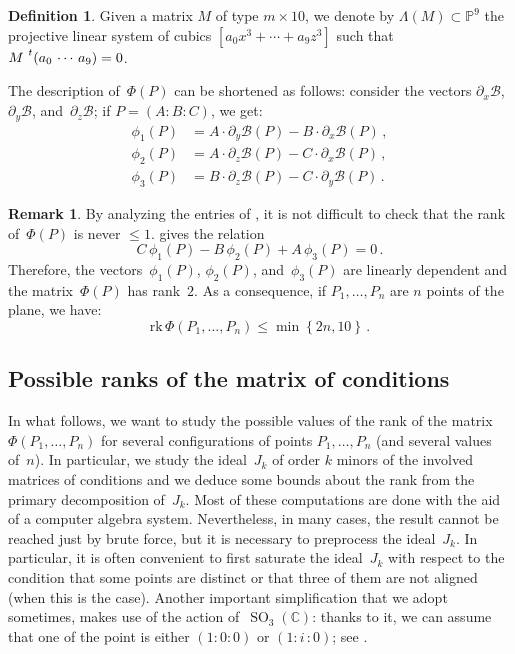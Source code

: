 \documentclass[a4paper, 11pt, reqno]{amsart}
\theoremstyle{plain}
\theoremstyle{definition}
\newtheorem{definition}[lemma]{Definition}
\newtheorem{rmk}[lemma]{Remark}
\newcommand{\C}{\mathbb{C}}
\newcommand{\p}{\mathbb{P}}
\newcommand{\de}{\partial}
\newcommand{\iii}{\textit{i}\,}
\newcommand{\rk}{\ensuremath{\mathrm{rk}}}
\newcommand{\SO}{\operatorname{SO}}
\begin{document}
\begin{definition}
Given a matrix $M$ of type $m \times 10$, we denote by $\Lambda(M) \subset \p^9$ the projective linear system of cubics $[a_0 x^3 + \dotsb + a_9 z^3]$ such that $M \, \prescript{t}{}{\left( a_0 \,  \cdots \,  a_9 \right)} = 0$.
\end{definition}

The description of~$\Phi(P)$ can be shortened as follows: consider the vectors $\de_x \mathcal{B}$,
$\de_y \mathcal{B}$, and~$\de_z \mathcal{B}$;
if $P=(A: B: C)$, we get:
%
\begin{equation}
\label{eq:vector_conditions}
  \begin{aligned}
    \phi_1(P) &= A\cdot \de_y \mathcal{B}(P) - B\cdot \de_x \mathcal{B}(P) \,, \\
    \phi_2(P) &= A\cdot \de_z \mathcal{B}(P) - C\cdot \de_x \mathcal{B}(P) \,, \\
    \phi_3(P) &= B\cdot \de_z \mathcal{B}(P) - C\cdot \de_y \mathcal{B}(P) \,.
  \end{aligned}
\end{equation}
%
\begin{rmk}
\label{remark:rank_2}
By analyzing the entries of , it is not difficult to check that the rank of~$\Phi(P)$ is never $\leq 1$.  gives the relation
%
\begin{equation}
\label{eq:syzygy}
  C \, \phi_1(P) - B \, \phi_2(P) + A \, \phi_3(P) = 0 \,.
\end{equation}
%
Therefore, the vectors~$\phi_1(P)$, $\phi_2(P)$, and~$\phi_3(P)$ are linearly dependent and the matrix~$\Phi(P)$ has rank~$2$.
As a consequence, if $P_1, \dots, P_n$ are $n$ points of the plane, we have:
%
\[
  \rk \,\Phi(P_1, \dots, P_n) \leq \min \left\{2n, 10 \right\} \,.
\]
%
\end{rmk}

\subsection{Possible ranks of the matrix of conditions}

In what follows, we want to study the possible values of the rank of the matrix
$\Phi(P_1, \dots, P_n)$ for several configurations of points $P_1, \dots, P_n$
(and several values of~$n$).
In particular, we study the ideal~$J_k$ of order $k$ minors of the
involved matrices of conditions and we deduce some bounds about the rank from the primary
decomposition of~$J_k$.
Most of these computations are done with the aid of a computer algebra system.
Nevertheless, in many cases, the result cannot be reached just by brute force,
but it is necessary to preprocess the ideal~$J_k$.
In particular, it is often convenient to first saturate the ideal~$J_k$ with respect to
the condition that some points are distinct or that three of them are not aligned
(when this is the case).
Another important simplification that we adopt sometimes, makes use
of the action of~$\SO_3(\C)$: thanks to it, we can assume that one of
the point is either $(1: 0: 0)$ or $(1: \iii: 0)$; see .
\end{document}
